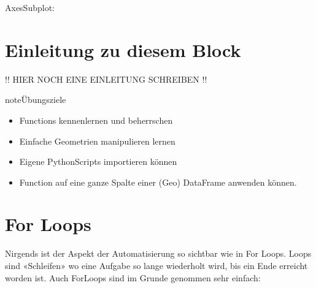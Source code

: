 \documentclass[letterpaper,10pt,english]{sphinxmanual}
\begin{document}
\begin{sphinxVerbatim}[commandchars=\\\{\}]
\PYGZlt{}AxesSubplot:\PYGZgt{}
\end{sphinxVerbatim}


\chapter{Einleitung zu diesem Block}
\label{\detokenize{03_01_Einleitung:einleitung-zu-diesem-block}}\label{\detokenize{03_01_Einleitung::doc}}
!! HIER NOCH EINE EINLEITUNG SCHREIBEN !!

\begin{sphinxadmonition}{note}{Übungsziele}
\begin{itemize}
\item {} 
Functions kennenlernen und beherrschen

\item {} 
Einfache Geometrien manipulieren lernen

\item {} 
Eigene Python\sphinxhyphen{}Scripts importieren können

\item {} 
Function auf eine ganze Spalte einer (Geo\sphinxhyphen{}) DataFrame anwenden können.

\end{itemize}
\end{sphinxadmonition}


\chapter{For Loops}
\label{\detokenize{03_02_For_Loops:for-loops}}\label{\detokenize{03_02_For_Loops::doc}}
Nirgends ist der Aspekt der Automatisierung so sichtbar wie in For Loops. Loops sind «Schleifen» wo eine Aufgabe so lange wiederholt wird, bis ein Ende erreicht worden ist. Auch For\sphinxhyphen{}Loops sind im Grunde genommen sehr einfach:

\begin{sphinxVerbatim}[commandchars=\\\{\}]
   \PYG{p}{[}\PYG{p}{]}
\end{sphinxVerbatim}
\end{document}
